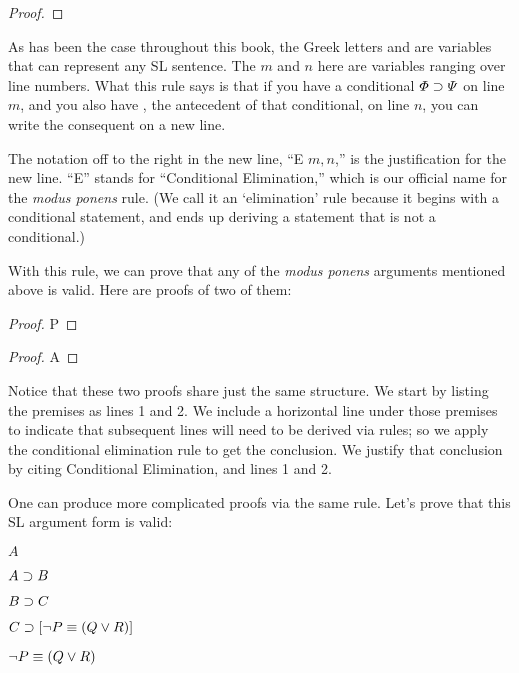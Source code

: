 \begin{proof}
	\metaA{}
	\metaB{} 
\end{proof}

As has been the case throughout this book, the Greek letters \metaA{} and \metaB{} are variables that can represent any SL sentence. The $m$ and $n$ here are variables ranging over line numbers. What this rule says is that if you have a conditional $\varPhi{}\supset\varPsi{}$ on line $m$, and you also have \metaA{}, the antecedent of that conditional, on line $n$, you can write the consequent \metaB{} on a new line.

The notation off to the right in the new line, ``\eif E $m, n$,'' is the justification for the new line. ``\eif E'' stands for ``Conditional Elimination,'' which is our official name for the \emph{modus ponens} rule. (We call it an `elimination' rule because it begins with a conditional statement, and ends up deriving a statement that is not a conditional.)

With this rule, we can prove that any of the \emph{modus ponens} arguments mentioned above is valid. Here are proofs of two of them:


\begin{multicols}{2}

\begin{proof}
	P
	 
\end{proof}


\begin{proof}
	A 
\end{proof}

\end{multicols}

Notice that these two proofs share just the same structure. We start by listing the premises as lines 1 and 2. We include a horizontal line under those premises to indicate that subsequent lines will need to be derived via rules; so we apply the conditional elimination rule to get the conclusion. We justify that conclusion by citing Conditional Elimination, and lines 1 and 2.

One can produce more complicated proofs via the same rule. Let's prove that this SL argument form is valid:

\begin{earg}

\item[] $A$
\item[] $A \supset B$
\item[] $B \supset C$
\item[] $C \supset [\neg P \equiv (Q \vee R)]$
\item[\therefore] $\neg P \equiv (Q \vee R)$
\end{earg}

